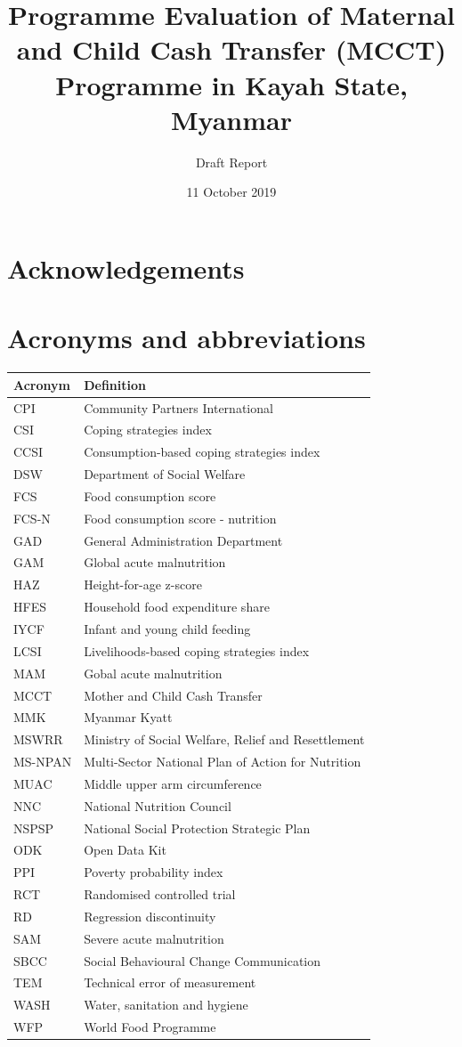 \documentclass[12pt,a4paper]{article}
\title{\vspace{8cm} \LARGE{Programme Evaluation of Maternal and Child Cash Transfer (MCCT) Programme in Kayah State, Myanmar}}
\subtitle{Draft Report}
\author{}
\date{11 October 2019}
\begin{document}
\maketitle

\newpage

{
\hypersetup{linkcolor=black}
\setcounter{tocdepth}{3}
\tableofcontents
}
\listoftables
\listoffigures
\newpage

\hypertarget{acknowledgements}{%
\section*{Acknowledgements}\label{acknowledgements}}

\newpage

\hypertarget{acronyms-and-abbreviations}{%
\section*{Acronyms and abbreviations}\label{acronyms-and-abbreviations}}

\begin{longtable}[]{@{}ll@{}}
\toprule
Acronym & Definition\tabularnewline
\midrule
\endhead
CPI & Community Partners International\tabularnewline
CSI & Coping strategies index\tabularnewline
CCSI & Consumption-based coping strategies index\tabularnewline
DSW & Department of Social Welfare\tabularnewline
FCS & Food consumption score\tabularnewline
FCS-N & Food consumption score - nutrition\tabularnewline
GAD & General Administration Department\tabularnewline
GAM & Global acute malnutrition\tabularnewline
HAZ & Height-for-age z-score\tabularnewline
HFES & Household food expenditure share\tabularnewline
IYCF & Infant and young child feeding\tabularnewline
LCSI & Livelihoods-based coping strategies index\tabularnewline
MAM & Gobal acute malnutrition\tabularnewline
MCCT & Mother and Child Cash Transfer\tabularnewline
MMK & Myanmar Kyatt\tabularnewline
MSWRR & Ministry of Social Welfare, Relief and Resettlement\tabularnewline
MS-NPAN & Multi-Sector National Plan of Action for Nutrition\tabularnewline
MUAC & Middle upper arm circumference\tabularnewline
NNC & National Nutrition Council\tabularnewline
NSPSP & National Social Protection Strategic Plan\tabularnewline
ODK & Open Data Kit\tabularnewline
PPI & Poverty probability index\tabularnewline
RCT & Randomised controlled trial\tabularnewline
RD & Regression discontinuity\tabularnewline
SAM & Severe acute malnutrition\tabularnewline
SBCC & Social Behavioural Change Communication\tabularnewline
TEM & Technical error of measurement\tabularnewline
WASH & Water, sanitation and hygiene\tabularnewline
WFP & World Food Programme\tabularnewline
\bottomrule
\end{longtable}
\end{document}
